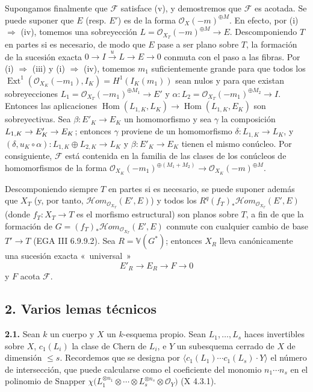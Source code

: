 Supongamos finalmente que \(\mathcal F\) satisface (v), y demostremos que
\(\mathcal F\) es acotada. Se puede suponer que \(E\) (resp. \(E'\)) es de
la forma \(\mathcal O_X(-m)^{\oplus M}\). En efecto, por (i)
\(\Rightarrow\) (iv), tomemos una sobreyección
\(L=\mathcal O_{X_T}(-m)^{\oplus M}\longrightarrow E\). Descomponiendo \(T\)
en partes si es necesario, de modo que \(E\) pase a ser plano sobre \(T\),
la formación de la sucesión exacta
\(0\longrightarrow I\xrightarrow{u}L\longrightarrow E\longrightarrow0\)
conmuta con el paso a las fibras. Por (i) \(\Rightarrow\) (iii) y (i)
\(\Rightarrow\) (iv), tomemos \(m_1\) suficientemente grande para que todos
los
\(\operatorname{Ext}^1(\mathcal O_{X_K}(-m_1),I_K)=H^1(I_K(m_1))\)
sean nulos y para que existan sobreyecciones
\(L_1=\mathcal O_{X_T}(-m_1)^{\oplus M_1}\longrightarrow E'\) y
\(\alpha:L_2=\mathcal O_{X_T}(-m_1)^{\oplus M_2}\longrightarrow I\).
Entonces las aplicaciones
\(\operatorname{Hom}(L_{1,K},L_K)\longrightarrow
\operatorname{Hom}(L_{1,K},E_K)\) son sobreyectivas. Sea
\(\beta:E'_K\to E_K\) un homomorfismo y sea \(\gamma\) la composición
\(\sisi{L'_K}{L_{1,K}}\to E'_K\to E_K\); entonces \(\gamma\) proviene de un homomorfismo %
\(\delta:L_{1,K}\to L_K\), y
$(\delta,u_K\circ\alpha):L_{1,K}\oplus L_{2,K}\longrightarrow L_K$ y
\(\beta:E'_K\to E_K\) tienen el mismo conúcleo. Por consiguiente,
\(\mathcal F\) está contenida en la familia de las clases de los conúcleos de
homomorfismos de la forma
\(\mathcal O_{X_K}(-m_1)^{\oplus(M_1+M_2)}\longrightarrow
\mathcal O_{X_K}(-m)^{\oplus M}\).

Descomponiendo siempre \(T\) en partes si es necesario, se puede suponer
además que \(X_T\) (y, por tanto,
\(\mathcal H\!om_{\mathcal O_{X_T}}(E',E)\)) y todos los
\(R^q(f_T)_*\mathcal H\!om_{\mathcal O_{X_T}}(E',E)\) (donde
\(f_T:X_T\to T\) es el morfismo estructural) son planos sobre \(T\), a fin de
que la formación de
\(G=(f_T)_*\mathcal H\!om_{\mathcal O_{X_T}}(E',E)\) conmute con cualquier
cambio de base \(T'\to T\) (EGA III 6.9.9.2). Sea $R=\mathbb V(G^*)$; entonces
\(X_R\) lleva canónicamente una sucesión exacta «~universal~»
\[
E'_R\longrightarrow E_R\longrightarrow F\longrightarrow0
\]
y \(F\) acota \(\mathcal F\).

\subsection*{2. Varios lemas técnicos}
\textbf{2.1.} Sean \(k\) un cuerpo y \(X\) un \(k\)-esquema propio. Sean
\(L_1,\ldots,L_s\) haces invertibles sobre \(X\), \(c_1(L_i)\) la clase de
Chern de \(L_i\), e \(Y\) un subesquema cerrado de \(X\) de dimensión
\(\le s\). Recordemos que se designa por
\(\langle c_1(L_1)\cdots c_1(L_s)\cdot Y\rangle\) el número de intersección,
que puede calcularse como el coeficiente del monomio \(n_1\cdots n_s\) en el
polinomio de Snapper
\(\chi\bigl(L_1^{\otimes n_1}\otimes\cdots\otimes L_s^{\otimes n_s}\otimes\mathcal O_Y\bigr)\)
(X 4.3.1).

